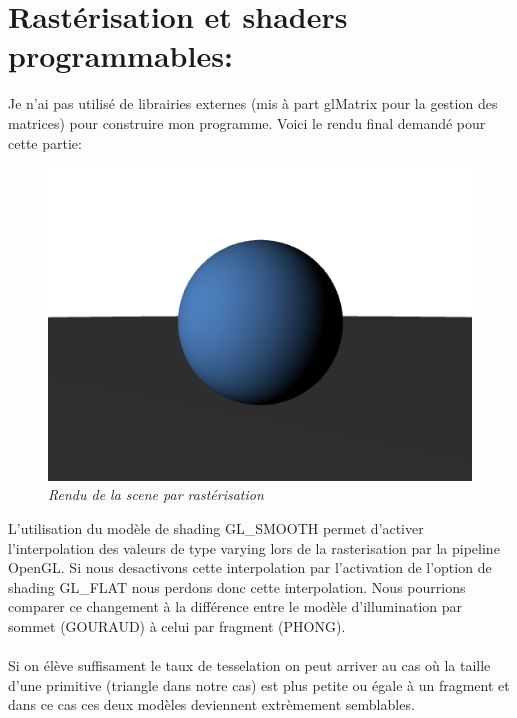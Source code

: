 \documentclass[12pt,letterpaper]{article}
\begin{document}
    
     
	\newpage 
    
    \section{Rastérisation et shaders programmables:}
	\setlength{\parindent}{1cm}

    Je n'ai pas utilisé de librairies externes (mis à part glMatrix pour la gestion des matrices) pour construire mon programme. Voici le rendu final demandé pour cette partie:\\
\begin{figure}[h!]
	\centering
	\includegraphics[scale=0.4]{images/rast.png}
	\caption{\textit{Rendu de la scene par rastérisation}}
\end{figure}

	L'utilisation du modèle de shading GL\_SMOOTH permet d'activer l'interpolation des valeurs de type varying lors de la rasterisation par la pipeline OpenGL. Si nous desactivons cette interpolation par l'activation de l'option de shading GL\_FLAT nous perdons donc cette interpolation. Nous pourrions comparer ce changement à la différence entre le modèle d'illumination par sommet (GOURAUD) à celui par fragment (PHONG).\\\\
	Si on élève suffisament le taux de tesselation on peut arriver au cas où la taille d'une primitive (triangle dans notre cas) est plus petite ou égale à un fragment et dans ce cas ces deux modèles deviennent extrèmement semblables.\\\\
\end{document}
